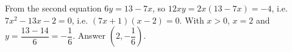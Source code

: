 From the second equation $6y=13-7x$, so $12xy=2x(13-7x)=-4$, i.e. $7x^2-13x-2=0$, i.e. $(7x+1)(x-2)=0$. With $x>0$, $x=2$ and $y=\dfrac{13-14}6=-\dfrac16$. Answer $\boxed{\left(2,-\dfrac16\right)}$.
